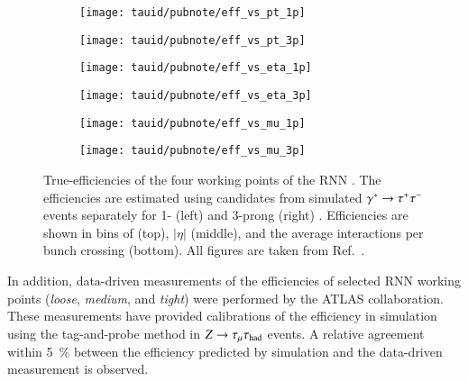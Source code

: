 \begin{figure}[htbp]

  \begin{subfigure}{0.498\textwidth}
    \texttt{[image: tauid/pubnote/eff\_vs\_pt\_1p]}
    \subcaption{}%
    \label{fig:tauid_truetau_eff_a}
  \end{subfigure}\hfill%
  \begin{subfigure}{0.498\textwidth}
    \texttt{[image: tauid/pubnote/eff\_vs\_pt\_3p]}
    \subcaption{}%
    \label{fig:tauid_truetau_eff_b}
  \end{subfigure}

  \begin{subfigure}{0.498\textwidth}
    \texttt{[image: tauid/pubnote/eff\_vs\_eta\_1p]}
    \subcaption{}
  \end{subfigure}\hfill%
  \begin{subfigure}{0.498\textwidth}
    \texttt{[image: tauid/pubnote/eff\_vs\_eta\_3p]}
    \subcaption{}
  \end{subfigure}

  \begin{subfigure}{0.498\textwidth}
    \texttt{[image: tauid/pubnote/eff\_vs\_mu\_1p]}
    \subcaption{}
  \end{subfigure}\hfill%
  \begin{subfigure}{0.498\textwidth}
    \texttt{[image: tauid/pubnote/eff\_vs\_mu\_3p]}
    \subcaption{}
  \end{subfigure}

  \caption{True-\tauhadvis efficiencies of the four working points of
    the RNN \tauid. The efficiencies are estimated using \tauhadvis
    candidates from simulated $\gamma^{*} \to \tau^{+} \tau^{-}$ events
    separately for 1- (left) and 3-prong (right)
    \tauhadvis. Efficiencies are shown in bins of \tauhadvis \pT
    (top), \tauhadvis $|\eta|$ (middle), and the average interactions
    per bunch crossing (bottom). All figures are taken from
    Ref.~\cite{ATL-PHYS-PUB-2019-033}.}%
  \label{fig:tauid_truetau_eff}
\end{figure}

In addition, data-driven measurements of the \truetauhadvis
efficiencies of selected RNN \tauid working points (\emph{loose},
\emph{medium}, and \emph{tight}) were performed by the ATLAS
collaboration. These measurements have provided calibrations of the
\truetauhadvis efficiency in simulation using the tag-and-probe method
in $Z \to \tau_\mu \tau_{\text{had}}$ events. A relative agreement within
\SI{5}{\percent} between the efficiency predicted by simulation and
the data-driven measurement is observed.

